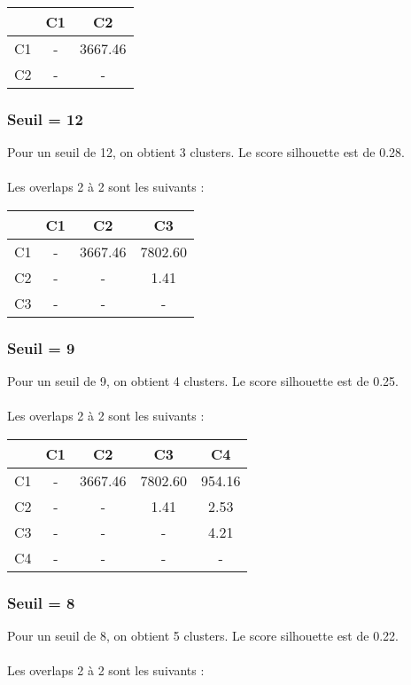\documentclass{article}
\begin{document}
\begin{tabular}{|c|c|c|}
\hline
& C1 & C2 \\
\hline
C1 & - & 3667.46 \\
\hline
C2 & - & - \\
\hline
\end{tabular}

\subsubsection*{Seuil = 12}
Pour un seuil de 12, on obtient 3 clusters. Le score silhouette est de 0.28.\\\\
Les overlaps 2 à 2 sont les suivants :\\

\begin{tabular}{|c|c|c|c|}
\hline
& C1 & C2 & C3 \\
\hline
C1 & - & 3667.46 & 7802.60 \\
\hline
C2 & - & - & 1.41 \\
\hline
C3 & - & - & - \\
\hline
\end{tabular}

\subsubsection*{Seuil = 9}

Pour un seuil de 9, on obtient 4 clusters. Le score silhouette est de 0.25.\\\\
Les overlaps 2 à 2 sont les suivants :\\

\begin{tabular}{|c|c|c|c|c|}
\hline
& C1 & C2 & C3 & C4 \\
\hline
C1 & - & 3667.46 & 7802.60 & 954.16 \\
\hline
C2 & - & - & 1.41 & 2.53 \\
\hline
C3 & - & - & - & 4.21 \\
\hline
C4 & - & - & - & - \\
\hline
\end{tabular}

\subsubsection*{Seuil = 8}
Pour un seuil de 8, on obtient 5 clusters. Le score silhouette est de 0.22.\\\\
Les overlaps 2 à 2 sont les suivants :\\
\end{document}
